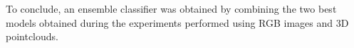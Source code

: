 \documentclass[11pt,a4paper]{article}
\begin{document}
To conclude, an ensemble classifier was obtained by combining the two best models obtained during the experiments performed using RGB images and 3D pointclouds.
\begin{figure}[H]
    \hspace*{-1cm}
    \qquad
\end{figure}
\end{document}
